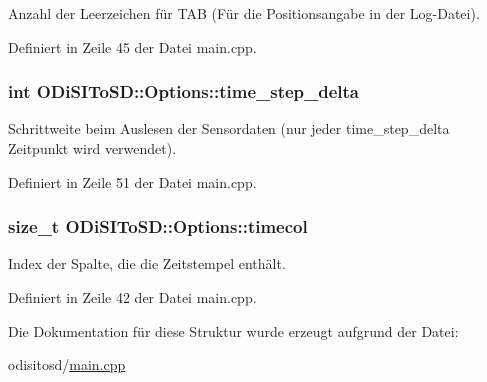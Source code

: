 Anzahl der Leerzeichen für T\-A\-B (Für die Positionsangabe in der Log-\/\-Datei). 



Definiert in Zeile 45 der Datei main.\-cpp.

\hypertarget{structODiSIToSD_1_1Options_a57e4e92fe940038d939143626301a61d}{
\subsubsection[{time\-\_\-step\-\_\-delta}]{\setlength{\rightskip}{0pt plus 5cm}int O\-Di\-S\-I\-To\-S\-D\-::\-Options\-::time\-\_\-step\-\_\-delta}}\label{structODiSIToSD_1_1Options_a57e4e92fe940038d939143626301a61d}


Schrittweite beim Auslesen der Sensordaten (nur jeder time\-\_\-step\-\_\-delta Zeitpunkt wird verwendet). 



Definiert in Zeile 51 der Datei main.\-cpp.

\hypertarget{structODiSIToSD_1_1Options_a63e45d6a87805ab4bfe9582e37f6c999}{
\subsubsection[{timecol}]{\setlength{\rightskip}{0pt plus 5cm}size\-\_\-t O\-Di\-S\-I\-To\-S\-D\-::\-Options\-::timecol}}\label{structODiSIToSD_1_1Options_a63e45d6a87805ab4bfe9582e37f6c999}


Index der Spalte, die die Zeitstempel enthält. 



Definiert in Zeile 42 der Datei main.\-cpp.



Die Dokumentation für diese Struktur wurde erzeugt aufgrund der Datei\-:\begin{DoxyCompactItemize}
\item 
odisitosd/\hyperlink{odisitosd_2main_8cpp}{main.\-cpp}\end{DoxyCompactItemize}

